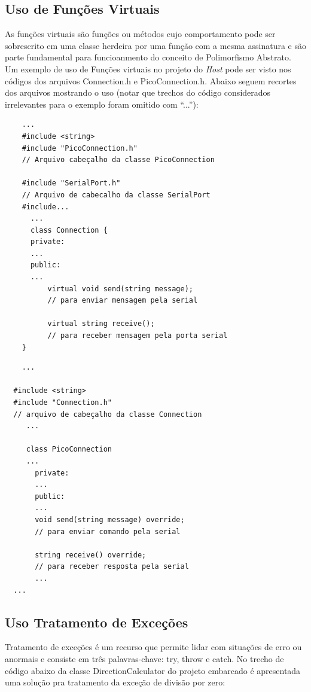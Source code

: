 \documentclass[10pt,twocolumn,letterpaper]{article}
\begin{document}
\subsection{Uso de Funções Virtuais}
As funções virtuais são funções ou métodos cujo comportamento pode ser sobrescrito em uma classe herdeira por uma função com a mesma assinatura e são parte fundamental para funcioanmento do conceito de Polimorfismo Abstrato.
Um exemplo de uso de Funções virtuais no projeto do \emph{Host} pode ser visto nos códigos dos arquivos Connection.h e PicoConnection.h. Abaixo seguem recortes dos arquivos mostrando o uso (notar que trechos do código considerados irrelevantes para o exemplo foram omitido com ``...''):
{\scriptsize
\begin{verbatim}
    ...
    #include <string>
    #include "PicoConnection.h" 
    // Arquivo cabeçalho da classe PicoConnection
    
    #include "SerialPort.h" 
    // Arquivo de cabecalho da classe SerialPort
    #include...
      ...
      class Connection {
      private:
      ...
      public:
      ...
          virtual void send(string message); 
          // para enviar mensagem pela serial
          
          virtual string receive(); 
          // para receber mensagem pela porta serial
    }
  \end{verbatim}
}  
{\scriptsize
\begin{verbatim}
    ...
  
  #include <string>
  #include "Connection.h" 
  // arquivo de cabeçalho da classe Connection
     ...
   
     class PicoConnection 
     ...
       private:
       ...
       public:
       ...
       void send(string message) override; 
       // para enviar comando pela serial

       string receive() override; 
       // para receber resposta pela serial
       ...
  ...  
\end{verbatim}
}

\subsection{Uso Tratamento de Exceções}
Tratamento de exceções é um recurso que permite lidar com situações de erro ou anormais e consiste em três palavras-chave: try, throw e catch.
No trecho de código abaixo da classe DirectionCalculator do projeto embarcado é apresentada uma solução pra tratamento da exceção de divisão por zero:
\end{document}
